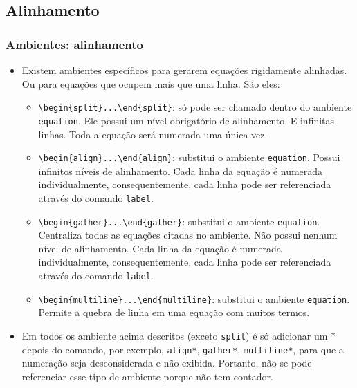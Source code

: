 \documentclass[brazilian]{beamer}
\begin{document}
\subsection{Alinhamento}
\begin{frame}
    \frametitle{Ambientes: alinhamento}

    \begin{itemize}
        \item Existem ambientes específicos para gerarem equações rigidamente alinhadas. Ou para equações que ocupem mais que uma linha. São eles:
        \begin{itemize}
            \item \lstinline[style=myStyleLatex]!\begin{split}...\end{split}!: só pode ser chamado dentro do ambiente \texttt{equation}. Ele possui um nível obrigatório de alinhamento. E infinitas linhas. Toda a equação será numerada uma única vez.
            \item \lstinline[style=myStyleLatex]!\begin{align}...\end{align}!: substitui o ambiente \texttt{equation}. Possui infinitos níveis de alinhamento. Cada linha da equação é numerada individualmente, consequentemente, cada linha pode ser referenciada através do comando \texttt{label}.
            \item \lstinline[style=myStyleLatex]!\begin{gather}...\end{gather}!: substitui o ambiente \texttt{equation}. Centraliza todas as equações citadas no ambiente. Não possui nenhum nível de alinhamento. Cada linha da equação é numerada individualmente, consequentemente, cada linha pode ser referenciada através do comando \texttt{label}.
            \item \lstinline[style=myStyleLatex]!\begin{multiline}...\end{multiline}!: substitui o ambiente \texttt{equation}. Permite a quebra de linha em uma equação com muitos termos.
        \end{itemize} 
        \item Em todos os ambiente acima descritos (exceto \texttt{split}) é só adicionar um * depois do comando, por exemplo, \texttt{align*}, \texttt{gather*}, \texttt{multiline*}, para que a numeração seja desconsiderada e não exibida. Portanto, não se pode referenciar esse tipo de ambiente porque não tem contador.  
    \end{itemize}

\end{frame}
\end{document}
